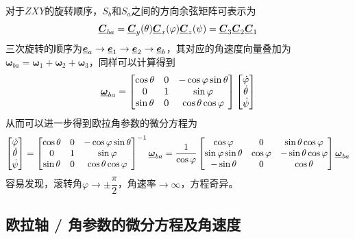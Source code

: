 \sssection[$ZXY$旋转]

对于$ZXY$的旋转顺序，$S_b$和$S_a$之间的方向余弦矩阵可表示为
\begin{equation*}
	\underline{\bm{C}}_{ba} = \underline{\bm{C}}_y (\theta) \underline{\bm{C}}_x (\varphi) \underline{\bm{C}}_z (\psi) = \underline{\bm{C}}_3 \underline{\bm{C}}_2 \underline{\bm{C}}_1
\end{equation*}
三次旋转的顺序为$\underline{\bm{e}}_a \to \underline{\bm{e}}_1 \to \underline{\bm{e}}_2 \to \underline{\bm{e}}_b$，其对应的角速度向量叠加为$\bm{\omega}_{ba} = \bm{\omega}_1 + \bm{\omega}_2 + \bm{\omega}_3$，同样可以计算得到
\begin{equation}
	\underline{\bm{\omega}}_{ba} = 
	\begin{bmatrix}
		\cos \theta & 0 & -\cos \varphi \sin \theta \\
		0 & 1 & \sin \varphi \\
		\sin \theta & 0 & \cos \theta \cos \varphi
	\end{bmatrix}
	\begin{bmatrix}
		\dot{\varphi} \\
		\dot{\theta} \\
		\dot{\psi}
	\end{bmatrix}
\end{equation}
从而可以进一步得到欧拉角参数的微分方程为
\begin{equation}
	\begin{bmatrix}
		\dot{\varphi} \\
		\dot{\theta} \\
		\dot{\psi}
	\end{bmatrix}
	=
	\begin{bmatrix}
		\cos \theta & 0 & -\cos \varphi \sin \theta \\
		0 & 1 & \sin \varphi \\
		\sin \theta & 0 & \cos \theta \cos \varphi
	\end{bmatrix}^{-1} 
	\underline{\bm{\omega}}_{ba} 
	=
	\dfrac{1}{\cos \varphi}
	\begin{bmatrix}
		\cos \varphi & 0 & \sin \theta \cos \varphi \\
		\sin \varphi \sin \theta & \cos \varphi & -\sin \theta \cos \varphi \\
		- \sin \theta & 0 & \cos \theta
	\end{bmatrix}
	\underline{\bm{\omega}}_{ba}
\end{equation}
容易发现，滚转角$\varphi \to \pm \dfrac{\pi}{2}$，角速率$\to \infty$，方程奇异。



\subsection{欧拉轴 / 角参数的微分方程及角速度}

